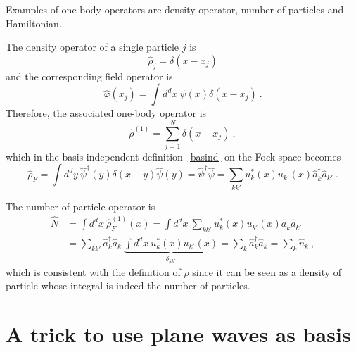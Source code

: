     Examples of one-body operators are density operator, number of particles and Hamiltonian.

    The density operator of a single particle $j$ is 
    \begin{equation*}
        \hat \rho_j = \delta (x - x_j)
    \end{equation*}
    and the corresponding field operator is 
    \begin{equation*}
        \hat \varphi (x_j) = \int d^d x ~ \psi (x) \delta (x - x_j) ~.
    \end{equation*}
    Therefore, the associated one-body operator is 
    \begin{equation*}
        \hat \rho^{(1)} = \sum_{j=1}^{N} \delta (x - x_j) ~,
    \end{equation*}
    which in the basis independent definition~\eqref{basind} on the Fock space becomes
    \begin{equation*}
        \hat \rho_F = \int d^d y ~ \hat \psi^\dagger (y) \delta (x - y) \hat \psi (y) = \hat \psi^\dagger \hat \psi = \sum_{kk'} u_k^* (x) u_{k'} (x) \hat a^\dagger_k \hat a_{k'} ~.
    \end{equation*}

    The number of particle operator is 
    \begin{equation*}
    \begin{aligned}
        \hat N & = \int d^d x ~ \hat \rho^{(1)}_F (x) = \int d^d x ~ \sum_{kk'} u^*_k (x) u_{k'} (x) \hat a^\dagger_k \hat a_{k'} \\ & = \sum_{kk'} \hat a^\dagger_k \hat a_{k'} \underbrace{\int d^d x ~ u^*_k (x) u_{k'} (x)}_{\delta_{kk'}} = \sum_k \hat a^\dagger_k \hat a_k = \sum_k \hat n_k ~,
    \end{aligned}
    \end{equation*}
    which is consistent with the definition of $\rho$ since it can be seen as a density of particle whose integral is indeed the number of particles.

\section{A trick to use plane waves as basis}

